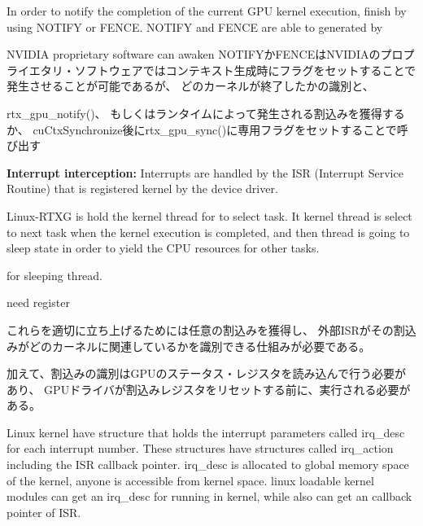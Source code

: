 In order to notify the completion of the current GPU kernel execution,  finish by using NOTIFY or FENCE.
NOTIFY and FENCE are able to generated by 

NVIDIA proprietary software can awaken 
NOTIFYかFENCEはNVIDIAのプロプライエタリ・ソフトウェアではコンテキスト生成時にフラグをセットすることで発生させることが可能であるが、
どのカーネルが終了したかの識別と、

rtx\_gpu\_notify()、
もしくはランタイムによって発生される割込みを獲得するか、
cuCtxSynchronize後にrtx\_gpu\_sync()に専用フラグをセットすることで呼び出す

\textbf{Interrupt interception:}
Interrupts are handled by the ISR (Interrupt Service Routine) that is registered kernel by the device driver.

Linux-RTXG is hold the kernel thread for to select task.
It kernel thread is select to next task when the kernel execution is completed,
and then thread is going to sleep state in order to yield the CPU resources for other tasks.

 for sleeping thread.

need 
register

これらを適切に立ち上げるためには任意の割込みを獲得し、
外部ISRがその割込みがどのカーネルに関連しているかを識別できる仕組みが必要である。

加えて、割込みの識別はGPUのステータス・レジスタを読み込んで行う必要があり、
GPUドライバが割込みレジスタをリセットする前に、実行される必要がある。

Linux kernel have structure that holds the interrupt parameters called irq\_desc for each interrupt number.
These structures have structures called irq\_action including the ISR callback pointer.
irq\_desc is allocated to global memory space of the kernel, anyone is accessible from kernel space.
linux loadable kernel modules can get an irq\_desc for running in kernel, while also can get an callback pointer of ISR.

